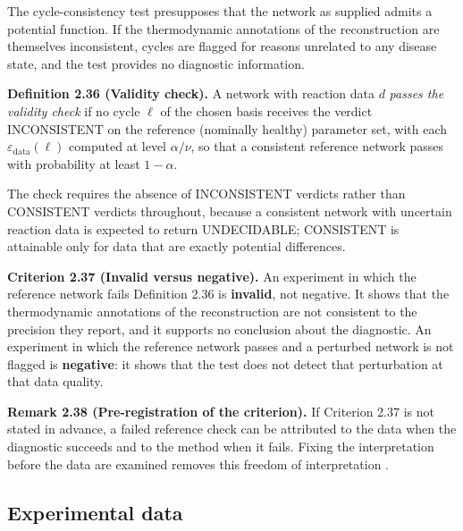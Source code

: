\documentclass[11pt,a4paper]{article}
\theoremstyle{pstyle}
\theoremstyle{definition}
\theoremstyle{remark}
\newcommand{\eps}{\varepsilon}
\newcommand{\epsdata}{\eps_{\mathrm{data}}}
\begin{document}
The cycle-consistency test presupposes that the network as supplied
admits a potential function. If the thermodynamic annotations of the
reconstruction are themselves inconsistent, cycles are flagged for
reasons unrelated to any disease state, and the test provides no
diagnostic information.

\par\noindent\textbf{Definition 2.36 (Validity check).}\label{def:validity} 
A network with reaction data $d$ \emph{passes the validity check} if no
cycle $\ell$ of the chosen basis receives the verdict
\textsf{INCONSISTENT} on the reference (nominally healthy) parameter
set, with each $\epsdata(\ell)$ computed at level $\alpha/\nu$, so that
a consistent reference network passes with probability at least
$1-\alpha$.
\par

The check requires the absence of \textsf{INCONSISTENT} verdicts rather
than \textsf{CONSISTENT} verdicts throughout, because a consistent
network with uncertain reaction data is expected to return
\textsf{UNDECIDABLE}; \textsf{CONSISTENT} is attainable only for data
that are exactly potential differences.

\par\noindent\textbf{Criterion 2.37 (Invalid versus negative).}\label{crit:invalid} 
An experiment in which the reference network fails
Definition 2.36 is \textbf{invalid}, not negative. It shows that the
thermodynamic annotations of the reconstruction are not consistent to
the precision they report, and it supports no conclusion about the
diagnostic. An experiment in which the reference network passes and a
perturbed network is not flagged is \textbf{negative}: it shows that
the test does not detect that perturbation at that data quality.
\par

\par\noindent\textbf{Remark 2.38 (Pre-registration of the criterion).}\label{rem:preregister} 
If Criterion 2.37 is not stated in advance, a failed reference
check can be attributed to the data when the diagnostic succeeds and to
the method when it fails. Fixing the interpretation before the data are
examined removes this freedom of interpretation
\citep{simmons2011,sandve2013}.
\par

\subsection{Experimental data}
\label{sec:data}
\end{document}
